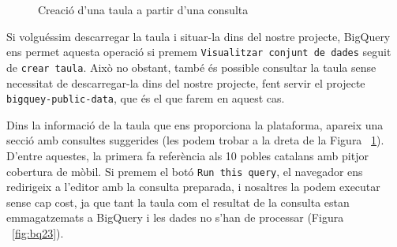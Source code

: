 \documentclass[11pt,longbibliography]{article}
\theoremstyle{definition}
\theoremstyle{remark}
\begin{document}
\begin{figure}[h!]
\par
{}%
\hfill
{}%
\par

\caption{Creació d'una taula a partir d'una consulta}
\label{fig:bq21}
\end{figure}


Si volguéssim descarregar la taula i situar-la dins del nostre projecte, BigQuery ens permet aquesta operació si premem \verb|Visualitzar conjunt de dades| seguit de \verb|crear taula|. Això no obstant, també és possible consultar la taula sense necessitat de descarregar-la dins del nostre projecte, fent servir el projecte \verb|bigquey-public-data|, que és el que farem en aquest cas.



Dins la informació de la taula que ens proporciona la plataforma, apareix una secció amb consultes suggerides (les podem trobar a la dreta de la Figura ~\ref{fig:bq21}). D'entre aquestes, la primera fa referència als 10 pobles catalans amb pitjor cobertura de mòbil.  Si premem el botó \verb|Run this query|, el navegador ens redirigeix a l'editor amb la consulta preparada, i nosaltres la podem executar sense cap cost, ja que tant la taula com el resultat de la consulta estan emmagatzemats a BigQuery i les dades no s'han de processar (Figura ~\ref{fig:bq23}).
\end{document}
